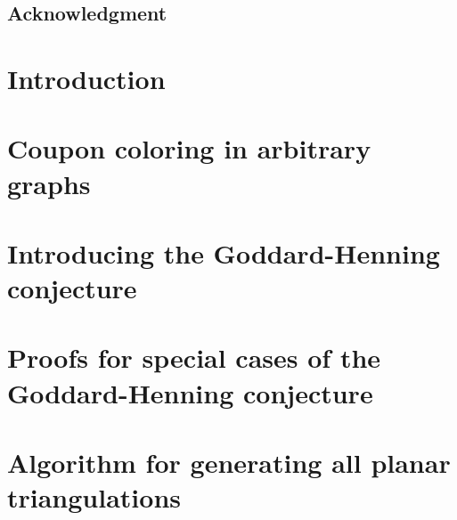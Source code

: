 \documentclass[12pt]{report}
\begin{document}


\newpage\null\thispagestyle{empty}\newpage

\tableofcontents

\newpage

\section*{Acknowledgment}


\chapter*{Introduction}


\chapter{Coupon coloring in arbitrary graphs} \label{ch:arbitrary}


\chapter{Introducing the Goddard-Henning conjecture} \label{ch:reformulating}


\chapter{Proofs for special cases of the Goddard-Henning conjecture} \label{ch:spec}


\chapter{Algorithm for generating all planar triangulations} \label{ch:alg}



\end{document}
